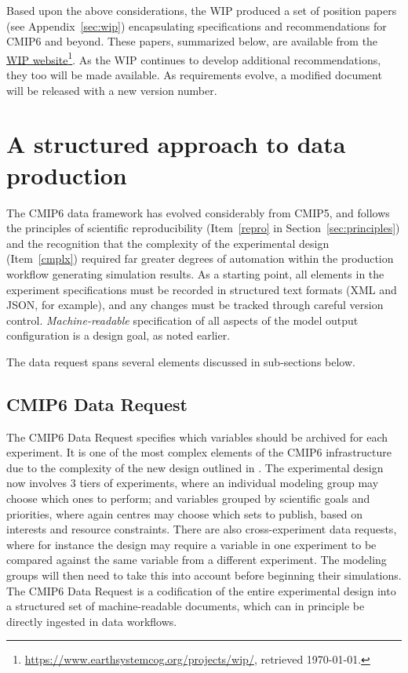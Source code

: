 \documentclass[gmd,manuscript]{copernicus}
\newcommand{\pllabel}[1]{\label{p-#1}\linelabel{l-#1}}
\newcommand{\urlref}[2] {\href{#1}{#2}\footnote{\url{#1}, retrieved \today.}}
\begin{document}
Based upon the above considerations, the WIP produced a set of position
papers (see Appendix~\ref{sec:wip}) encapsulating specifications and
recommendations for CMIP6 and beyond. These papers, summarized below,
are available from the
\urlref{https://www.earthsystemcog.org/projects/wip/}{WIP website}. As
the WIP continues to develop additional recommendations, they too will
be made available. As requirements evolve, a modified document will
be released with a new version number.

\section{A structured approach to data production}
\label{sec:dreq}

The CMIP6 data framework has evolved considerably from CMIP5, and
follows the principles of scientific reproducibility (Item~\ref{repro}
in Section~\ref{sec:principles}) and the recognition that the
complexity of the experimental design (Item~\ref{cmplx}) required far
greater degrees of automation within the production workflow generating 
simulation results. As a starting point, 
 all elements in the experiment specifications must be recorded in
structured text formats (XML and JSON, for example), and any changes
must be tracked through careful version control. \emph{Machine-readable} specification of all
 aspects of the model output configuration is a
design goal, as noted earlier.

The data request spans several elements discussed in sub-sections
below.

\subsection{CMIP6 Data Request}
\label{sec:data-request}

\pllabel{RC2-18}
The CMIP6 Data Request specifies which variables should be archived for
each experiment.  It is one of the most complex elements of the
CMIP6 infrastructure due to the complexity of the
new design outlined in \cite{ref:eyringetal2016a}. The experimental
design now involves 3 tiers of experiments, where an individual
modeling group may choose which ones to perform; and variables grouped
by scientific goals and priorities, where again centres may choose
which sets to publish, based on interests and resource constraints.
There are also cross-experiment data requests, where for instance the
design may require a variable in one experiment to be compared against
the same variable from a different experiment. The modeling groups
will then need to take this into account before beginning their
simulations. The CMIP6 Data Request is a codification of the entire
experimental design into a structured set of machine-readable
documents, which can in principle be directly ingested in data
workflows.
\end{document}
